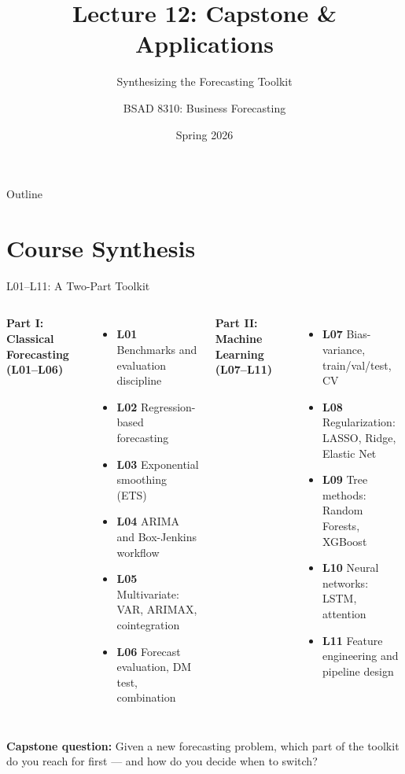 \documentclass[aspectratio=169, 10pt]{beamer}
\title{Lecture 12: Capstone \& Applications}
\subtitle{Synthesizing the Forecasting Toolkit}
\author{BSAD 8310: Business Forecasting}
\institute{University of Nebraska at Omaha}
\date{Spring 2026}
\begin{document}
\begin{frame}
  \titlepage
\end{frame}

\begin{frame}{Outline}
  \tableofcontents
\end{frame}

\section{Course Synthesis}


\begin{frame}{L01--L11: A Two-Part Toolkit}
  \begin{columns}[T]
      \textbf{Part I: Classical Forecasting (L01--L06)}
      \begin{itemize}\small
        \item \textbf{L01} Benchmarks and evaluation discipline
        \item \textbf{L02} Regression-based forecasting
        \item \textbf{L03} Exponential smoothing (ETS)
        \item \textbf{L04} ARIMA and Box-Jenkins workflow
        \item \textbf{L05} Multivariate: VAR, ARIMAX, cointegration
        \item \textbf{L06} Forecast evaluation, DM test, combination
      \end{itemize}
      \textbf{Part II: Machine Learning (L07--L11)}
      \begin{itemize}\small
        \item \textbf{L07} Bias-variance, train/val/test, CV
        \item \textbf{L08} Regularization: LASSO, Ridge, Elastic Net
        \item \textbf{L09} Tree methods: Random Forests, XGBoost
        \item \textbf{L10} Neural networks: LSTM, attention
        \item \textbf{L11} Feature engineering and pipeline design
      \end{itemize}
  \end{columns}
  \vspace{0.2cm}
  \begin{keybox}
    {\small \textbf{Capstone question:} Given a new forecasting problem,
    which part of the toolkit do you reach for first --- and how do you
    decide when to switch?}
  \end{keybox}
\end{frame}
\end{document}
